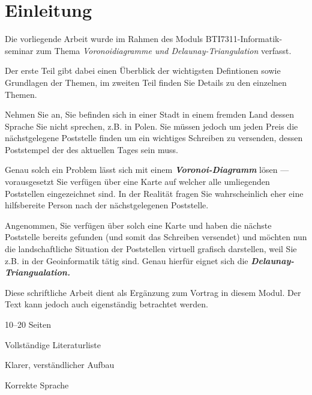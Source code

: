 \section{Einleitung}
\label{sec:introduction}
Die vorliegende Arbeit wurde im Rahmen des Moduls BTI7311-Informatik-\\
seminar zum Thema \textit{Voronoidiagramme und Delaunay-Triangulation} verfasst.

Der erste Teil gibt dabei einen Überblick der wichtigsten Defintionen sowie Grundlagen der Themen, 
im zweiten Teil finden Sie Details zu den einzelnen Themen.

Nehmen Sie an, Sie befinden sich in einer Stadt in einem fremden Land dessen Sprache Sie nicht sprechen, z.B. in Polen.
Sie müssen jedoch um jeden Preis die nächstgelegene Poststelle finden um ein wichtiges Schreiben zu versenden, dessen
Poststempel der des aktuellen Tages sein muss.

Genau solch ein Problem lässt sich mit einem \textit{\textbf{Voronoi-Diagramm}} lösen --- vorausgesetzt Sie verfügen über eine Karte auf welcher
alle umliegenden Poststellen eingezeichnet sind. In der Realität fragen Sie wahrscheinlich eher eine hilfsbereite Person
nach der nächstgelegenen Poststelle.

Angenommen, Sie verfügen über solch eine Karte und haben die nächste Poststelle bereits gefunden (und somit das Schreiben versendet) und
möchten nun die landschaftliche Situation der Poststellen virtuell grafisch darstellen, weil Sie z.B. in der Geoinformatik tätig sind. Genau hierfür
eignet sich die \textit{\textbf{Delaunay-Triangualation.}}

Diese schriftliche Arbeit dient als Ergänzung zum Vortrag in diesem Modul.
Der Text kann jedoch auch eigenständig betrachtet werden.

\noindent [TODO:]
\begin{compactitem}
	\item 10--20 Seiten
	\item Vollständige Literaturliste
	\item Klarer, verständlicher Aufbau
	\item Korrekte Sprache
\end{compactitem}
